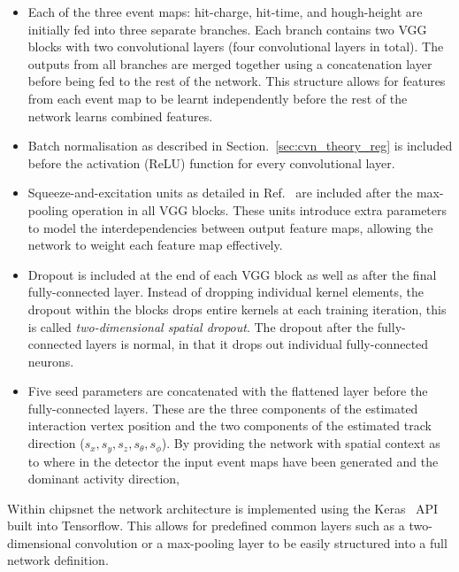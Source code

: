 \begin{itemize}
    \item Each of the three event maps: hit-charge, hit-time, and hough-height are initially fed
          into three separate branches. Each branch contains two VGG blocks with two convolutional
          layers (four convolutional layers in total). The outputs from all branches are merged
          together using a concatenation layer before being fed to the rest of the network. This
          structure allows for features from each event map to be learnt independently before the
          rest of the network learns combined features.

    \item Batch normalisation as described in Section.~\ref{sec:cvn_theory_reg} is included before
          the activation (ReLU) function for every convolutional layer.

    \item Squeeze-and-excitation units as detailed in Ref.~\cite{hu2018} are included after the
          max-pooling operation in all VGG blocks. These units introduce extra parameters to model
          the interdependencies between output feature maps, allowing the network to weight each
          feature map effectively.

    \item Dropout is included at the end of each VGG block as well as after the final
          fully-connected layer. Instead of dropping individual kernel elements, the dropout
          within the blocks drops entire kernels at each training iteration, this is called
          \emph{two-dimensional spatial dropout}. The dropout after the fully-connected layers is
          normal, in that it drops out individual fully-connected neurons.

    \item Five seed parameters are concatenated with the flattened layer before the
          fully-connected layers. These are the three components of the estimated interaction
          vertex position and the two components of the estimated track direction ($s_{x},s_{y},
              s_{z},s_{\theta},s_{\phi}$). By providing the network with spatial context as to where
          in the detector the input event maps have been generated and the dominant activity
          direction,
\end{itemize}

Within chipsnet the network architecture is implemented using the Keras~\cite{chollet2015} API
built into Tensorflow. This allows for predefined common layers such as a two-dimensional
convolution or a max-pooling layer to be easily structured into a full network definition.

